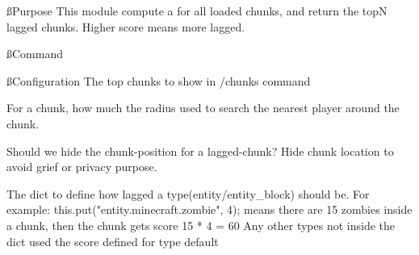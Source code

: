 \ss{Purpose}
This module compute a  for all loaded chunks, and return the topN lagged chunks.
Higher score means more lagged.

\ss{Command}

\ss{Configuration}
The top chunks to show in /chunks command

For a chunk, how much the radius used to search the nearest player around the chunk.

Should we hide the chunk-position for a lagged-chunk?
Hide chunk location to avoid grief or privacy purpose.

The dict to define how lagged a type(entity/entity\_block) should be.
For example:
this.put("entity.minecraft.zombie", 4); means there are 15 zombies inside a chunk,
then the chunk gets score 15 * 4 = 60
Any other types not inside the dict used the score defined for type default